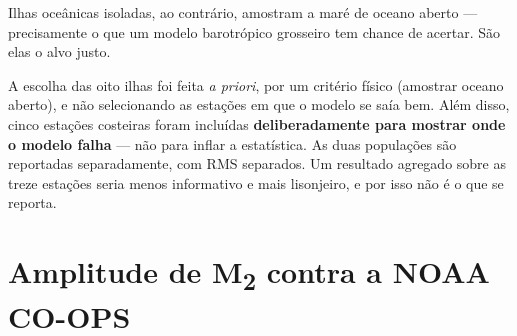 \documentclass[11pt,a4paper,oneside]{report}
\theoremstyle{definition}
\theoremstyle{plain}
\theoremstyle{remark}
\begin{document}
Ilhas oceânicas isoladas, ao contrário, amostram a maré de oceano aberto —
precisamente o que um modelo barotrópico grosseiro tem chance de acertar. São
elas o alvo justo.

\begin{caixa}
A escolha das oito ilhas foi feita \emph{a priori}, por um critério físico
(amostrar oceano aberto), e não selecionando as estações em que o modelo se
saía bem. Além disso, cinco estações costeiras foram incluídas
\textbf{deliberadamente para mostrar onde o modelo falha} — não para inflar a
estatística. As duas populações são reportadas separadamente, com RMS
separados. Um resultado agregado sobre as treze estações seria menos
informativo e mais lisonjeiro, e por isso não é o que se reporta.
\end{caixa}

\section{Amplitude de M\textsubscript{2} contra a NOAA CO-OPS}
\end{document}
